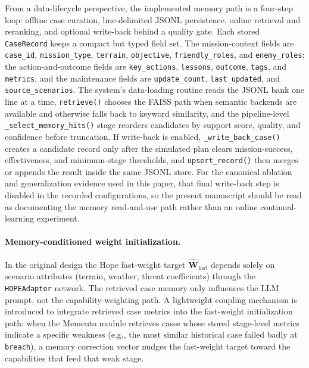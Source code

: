 From a data-lifecycle perspective, the implemented memory path is a four-step loop: offline case curation, line-delimited JSONL persistence, online retrieval and reranking, and optional write-back behind a quality gate. Each stored \texttt{CaseRecord} keeps a compact but typed field set. The mission-context fields are \texttt{case\_id}, \texttt{mission\_type}, \texttt{terrain}, \texttt{objective}, \texttt{friendly\_roles}, and \texttt{enemy\_roles}; the action-and-outcome fields are \texttt{key\_actions}, \texttt{lessons}, \texttt{outcome}, \texttt{tags}, and \texttt{metrics}; and the maintenance fields are \texttt{update\_count}, \texttt{last\_updated}, and \texttt{source\_scenarios}. The system's data-loading routine reads the JSONL bank one line at a time, \texttt{retrieve()} chooses the FAISS path when semantic backends are available and otherwise falls back to keyword similarity, and the pipeline-level \texttt{\_select\_memory\_hits()} stage reorders candidates by support score, quality, and confidence before truncation. If write-back is enabled, \texttt{\_write\_back\_case()} creates a candidate record only after the simulated plan clears mission-success, effectiveness, and minimum-stage thresholds, and \texttt{upsert\_record()} then merges or appends the result inside the same JSONL store. For the canonical ablation and generalization evidence used in this paper, that final write-back step is disabled in the recorded configurations, so the present manuscript should be read as documenting the memory read-and-use path rather than an online continual-learning experiment.

\paragraph{Memory-conditioned weight initialization.}
In the original design the Hope fast-weight target $\hat{\mathbf{W}}_{\text{fast}}$ depends solely on scenario attributes (terrain, weather, threat coefficients) through the \texttt{HOPEAdapter} network. The retrieved case memory only influences the LLM prompt, not the capability-weighting path. A lightweight coupling mechanism is introduced to integrate retrieved case metrics into the fast-weight initialization path: when the Memento module retrieves cases whose stored stage-level metrics indicate a specific weakness (e.g., the most similar historical case failed badly at \texttt{breach}), a memory correction vector nudges the fast-weight target toward the capabilities that feed that weak stage.

